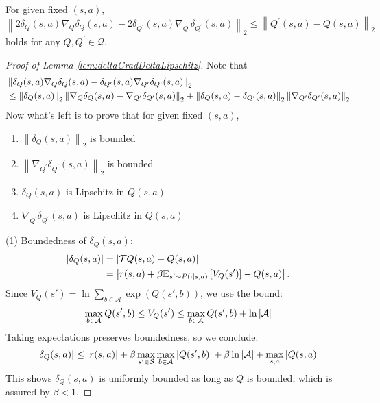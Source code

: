 \begin{lem}
\label{lem:deltaGradDeltaLipschitz}
For given fixed $(s,a)$, 
$$
\left\|2 \delta_Q(s, a) \nabla_Q \delta_Q(s, a)-2 \delta_{Q^\prime}(s, a) \nabla_{Q^\prime} \delta_{Q^\prime}(s, a)\right\|_2 \le \left\|Q^{\prime}(s,a)-Q(s, a)\right\|_2 
$$
holds for any $Q, Q^\prime \in\mathcal{Q}$.
\end{lem}
\begin{proof}[Proof of Lemma \ref{lem:deltaGradDeltaLipschitz}]
    Note that 
\begin{align}
   &\left\|\delta_Q(s, a) \nabla_Q \delta_Q(s, a)-\delta_{Q^{\prime}}(s, a) \nabla_{Q^{\prime}} \delta_{Q^{\prime}}(s, a)\right\|_2   \notag
   \\
   &\le \left\|\delta_Q(s, a)\right\|_2\left\|\nabla_Q \delta_Q(s, a) - \nabla_{Q^\prime} \delta_{Q^\prime}(s, a) \right\|_2 +  \left\|\delta_Q(s, a)-\delta_{Q^\prime}(s, a)\right\|_2 \left\| \nabla_{Q^\prime}\delta_{Q^\prime}(s,a)\right\|_2 \notag
\end{align}
Now what's left is to prove that for given fixed $(s,a)$, 
\begin{enumerate}
    \item $ \left\|\delta_Q(s, a)\right\|_2$ is bounded
    \item $\left\| \nabla_{Q^\prime}\delta_{Q^\prime}(s,a)\right\|_2$ is bounded
    \item $\delta_Q(s, a)$ is Lipschitz in $Q(s,a)$
    \item $\nabla_{Q^\prime}\delta_{Q^\prime}(s,a)$ is Lipschitz in $Q(s,a)$
\end{enumerate}

\noindent (1) Boundedness of \( \delta_Q(s,a) \):
\begin{align}
    |\delta_Q(s, a)| &= \left| \mathcal{T}Q(s,a) - Q(s,a) \right| \notag
    \\
    &= \left| r(s,a) + \beta \mathbb{E}_{s' \sim P(\cdot \mid s,a)} \left[V_Q(s')\right] - Q(s,a) \right|. \notag
\end{align}
Since \(V_Q(s') = \ln \sum_{b \in \mathcal{A}} \exp(Q(s',b))\), we use the bound:
\begin{align}
    \max_{b \in \mathcal{A}} Q(s',b) \leq V_Q(s') \leq \max_{b \in \mathcal{A}} Q(s',b) + \ln |\mathcal{A}| \notag
\end{align}
Taking expectations preserves boundedness, so we conclude:
\begin{align}
    |\delta_Q(s,a)| \leq |r(s,a)| + \beta \max_{s' \in \mathcal{S}} \max_{b \in \mathcal{A}} |Q(s',b)| + \beta \ln |\mathcal{A}| + \max_{s,a} |Q(s,a)| \notag
\end{align}
This shows \( \delta_Q(s,a) \) is uniformly bounded as long as \( Q \) is bounded, which is assured by $\beta<1$. 


\end{proof}
